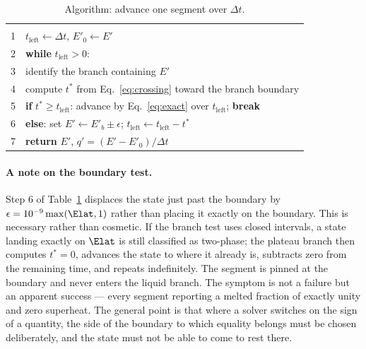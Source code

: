 \begin{table}[htbp]
\centering
\caption{Algorithm: advance one segment over $\Delta t$.}
\label{tab:algorithm}
\begin{tabular}{@{}r l@{}}
\toprule
 & \\[-8pt]
1 & $t_{\mathrm{left}} \leftarrow \Delta t$, \quad $E'_{0}\leftarrow E'$ \\
2 & \textbf{while} $t_{\mathrm{left}}>0$: \\
3 & \quad identify the branch containing $E'$ \\
4 & \quad compute $t^{*}$ from Eq.~\eqref{eq:crossing} toward the branch boundary \\
5 & \quad \textbf{if} $t^{*} \ge t_{\mathrm{left}}$: advance by Eq.~\eqref{eq:exact}
        over $t_{\mathrm{left}}$; \textbf{break} \\
6 & \quad \textbf{else}: set $E'\leftarrow E'_{b}\pm\epsilon$;\quad
        $t_{\mathrm{left}} \leftarrow t_{\mathrm{left}}-t^{*}$ \\
7 & \textbf{return} $E'$, \quad $q' = (E'-E'_{0})/\Delta t$ \\[2pt]
\bottomrule
\end{tabular}
\end{table}

\paragraph{A note on the boundary test.}
Step 6 of Table~\ref{tab:algorithm} displaces the state just past the boundary
by $\epsilon=10^{-9}\max(\Elat,1)$ rather than placing it exactly on the
boundary. This is necessary rather than cosmetic. If the branch test uses closed
intervals, a state landing exactly on $\Elat$ is still classified as two-phase;
the plateau branch then computes $t^{*}=0$, advances the state to where it
already is, subtracts zero from the remaining time, and repeats indefinitely.
The segment is pinned at the boundary and never enters the liquid branch. The
symptom is not a failure but an apparent success --- every segment reporting a
melted fraction of exactly unity and zero superheat. The general point is that
where a solver switches on the sign of a quantity, the side of the boundary to
which equality belongs must be chosen deliberately, and the state must not be
able to come to rest there.

